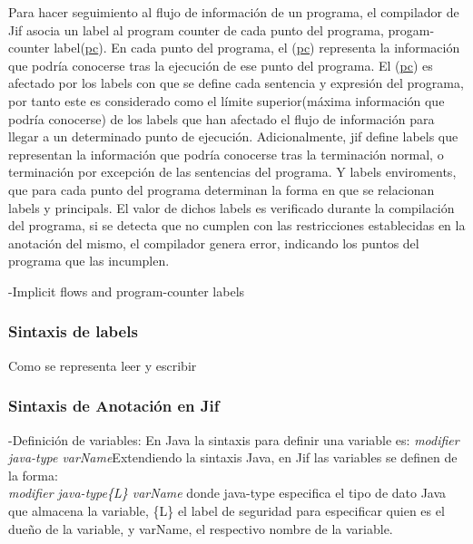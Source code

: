 Para hacer seguimiento al flujo de información de un programa, el compilador de
Jif asocia un label al program counter de cada punto del programa,
progam-counter label(\underline{pc}). En cada punto del programa, el
(\underline{pc}) representa la información que podría conocerse tras la
ejecución de ese punto del programa.
El (\underline{pc}) es afectado por los labels con que se define cada sentencia
y expresión del programa, por tanto este es considerado como el límite
superior(máxima información que podría conocerse) de los labels que han afectado
el flujo de información para llegar a un determinado punto de ejecución.\newline
Adicionalmente, jif define labels que representan la información que podría
conocerse tras la terminación normal, o terminación por excepción de las
sentencias del programa. Y labels enviroments, que para cada punto del programa
determinan la forma en que se relacionan labels y principals.\newline
El valor de dichos labels es verificado durante la compilación del programa, si
se detecta que no cumplen con las restricciones establecidas en la anotación del
mismo, el compilador genera error, indicando los puntos del programa que las
incumplen.\newline

-Implicit flows and program-counter labels\newline

\subsubsection{Sintaxis de labels}
Como se representa leer y escribir

\subsubsection{Sintaxis de Anotación en Jif}
\label{sssec:JifSintax} 

-Definición de variables: \newline 
En Java la sintaxis para definir una variable es: \emph{ modifier java-type
varName}\newline Extendiendo la sintaxis Java, en Jif las variables se definen de la forma:\\
\emph{ modifier java-type\{L\} varName}\newline 
donde java-type especifica el tipo de dato Java que almacena la variable, \{L\}
el label de seguridad  para especificar quien es el dueño de la variable, y
varName, el respectivo nombre de la variable.

